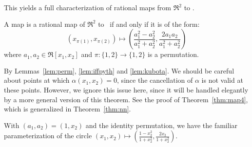 \noindent This yields 
a full characterization of rational maps from $\Re^2$ to .
%
\begin{theorem}
\label{thm:n2}
A map is a rational map of $\Re^2$ to \ if and only if 
it is of the form:
\begin{equation}
\label{eq:rationaltoS1}
	(x_{\pi(1)},x_{\pi(2)}) \mapsto (\frac{a_1^2 - a_2^2}{a_1^2 + a_2^2}, 
			   \frac{2a_1 a_2}{a_1^2 + a_2^2})
\end{equation}
where $a_1,a_2 \in \Re[x_1,x_2]$ and $\pi : \{1,2\} \rightarrow \{1,2\}$
is a permutation.
\end{theorem}
\prf
By Lemmas~\ref{lem:perm}, \ref{lem:iffpyth} and \ref{lem:kubota}.
We should be careful about points at which $\alpha(x_1,x_2) = 0$,
since the cancellation of $\alpha$ is not valid at these points.
However, we ignore this issue here, since it will be handled elegantly
by a more general version of this theorem.
See the proof of Theorem~\ref{thm:map4}, which is generalized in Theorem~\ref{thm:nn}.
\QED


\begin{example}
With $(a_1,a_2) = (1,x_2)$ and the identity permutation,
we have the familiar parameterization of the circle
$(x_1,x_2) \mapsto (\frac{1 - x_2^2}{1 + x_2^2}, 
				 \frac{2x_2}{1 + x_2^2})$.
\end{example}

